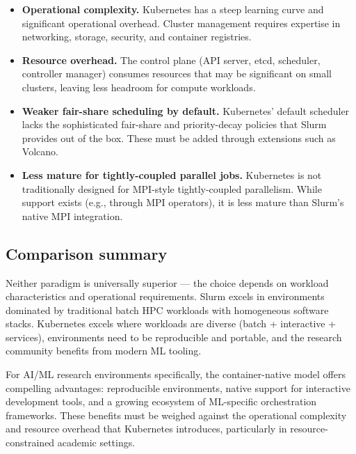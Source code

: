 \begin{itemize}
    \item \textbf{Operational complexity.} Kubernetes has a steep learning curve and significant operational overhead. Cluster management requires expertise in networking, storage, security, and container registries.

    \item \textbf{Resource overhead.} The control plane (API server, etcd, scheduler, controller manager) consumes resources that may be significant on small clusters, leaving less headroom for compute workloads.

    \item \textbf{Weaker fair-share scheduling by default.} Kubernetes' default scheduler lacks the sophisticated fair-share and priority-decay policies that Slurm provides out of the box. These must be added through extensions such as Volcano.
    \item \textbf{Less mature for tightly-coupled parallel jobs.} Kubernetes is not traditionally designed for MPI-style tightly-coupled parallelism. While support exists (e.g., through MPI operators), it is less mature than Slurm's native MPI integration.

\end{itemize}

\subsection{Comparison summary}

Neither paradigm is universally superior --- the choice depends on workload characteristics and operational requirements. Slurm excels in environments dominated by traditional batch HPC workloads with homogeneous software stacks. Kubernetes excels where workloads are diverse (batch + interactive + services), environments need to be reproducible and portable, and the research community benefits from modern ML tooling.

For AI/ML research environments specifically, the container-native model offers compelling advantages: reproducible environments, native support for interactive development tools, and a growing ecosystem of ML-specific orchestration frameworks. These benefits must be weighed against the operational complexity and resource overhead that Kubernetes introduces, particularly in resource-constrained academic settings.

